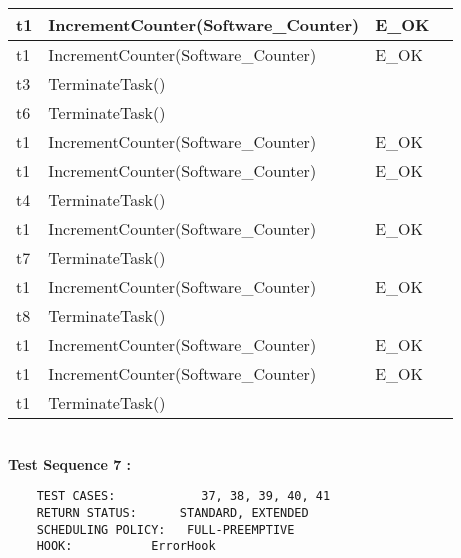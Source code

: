 \documentclass[10pt]{article}
\newlength{\Li}\settowidth{\Li}{Running}
\newlength{\Lii}\setlength{\Lii}{7cm}
\newlength{\Liiii}\setlength{\Liiii}{0.9cm}
\newlength{\Liii}\setlength{\Liii}{\textwidth} \addtolength{\Liii}{-\Li} \addtolength{\Liii}{-\Lii} \addtolength{\Liii}{-\Liiii}
\begin{document}
\begin{supertabular}{|p{\Li}|p{\Lii}|p{\Liii}|p{\Liiii}|}
	t1		& IncrementCounter(Software\_Counter)										& E\_OK												& \\ \hline
	t1		& IncrementCounter(Software\_Counter)										& E\_OK												& \\ \hline
	t3		& TerminateTask()														& 													& \\ \hline
	t6		& TerminateTask()														& 													& \\ \hline

	t1		& IncrementCounter(Software\_Counter)										& E\_OK												& \\ \hline
	t1		& IncrementCounter(Software\_Counter)										& E\_OK												& \\ \hline
	t4		& TerminateTask()														& 													& \\ \hline

	t1		& IncrementCounter(Software\_Counter)										& E\_OK												& \\ \hline
	t7		& TerminateTask()														& 													& \\ \hline

	t1		& IncrementCounter(Software\_Counter)										& E\_OK												& \\ \hline
	t8		& TerminateTask()														& 													& \\ \hline
	
	t1		& IncrementCounter(Software\_Counter)										& E\_OK												& \\ \hline
	t1		& IncrementCounter(Software\_Counter)										& E\_OK												& \\ \hline
	t1		& TerminateTask()														& 													& \\ \hline
	\end{supertabular}\\
	
	
	\textbf{Test Sequence 7 :}
	\begin{lstlisting}
	TEST CASES:		       37, 38, 39, 40, 41
	RETURN STATUS:	  	STANDARD, EXTENDED
	SCHEDULING POLICY:   FULL-PREEMPTIVE
	HOOK:			ErrorHook
	\end{lstlisting}
	
\end{document}
